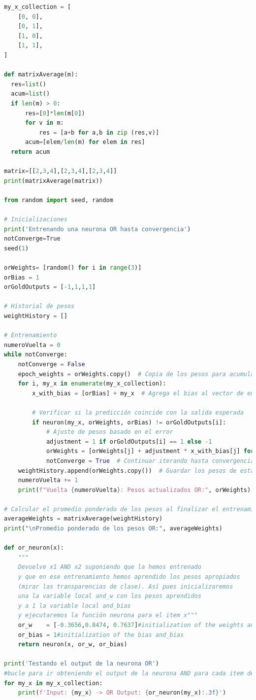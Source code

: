 \documentclass{report}
\begin{document}
        \clearpage
        \begin{lstlisting}[language=Python, caption=Implementación del perceptron para las puerta lógica OR con Weighted average]
my_x_collection = [
    [0, 0],
    [0, 1],
    [1, 0],
    [1, 1],
]

def matrixAverage(m):
  res=list()
  acum=list()
  if len(m) > 0:
      res=[0]*len(m[0])
      for v in m:
          res = [a+b for a,b in zip (res,v)]
      acum=[elem/len(m) for elem in res]
  return acum

matrix=[[2,3,4],[2,3,4],[2,3,4]]
print(matrixAverage(matrix))

from random import seed, random

# Inicializaciones
print('Entrenando una neurona OR hasta convergencia')
notConverge=True
seed(1)

orWeights= [random() for i in range(3)]
orBias = 1
orGoldOutputs = [-1,1,1,1]

# Historial de pesos
weightHistory = []

# Entrenamiento
numeroVuelta = 0
while notConverge:
    notConverge = False
    epoch_weights = orWeights.copy()  # Copia de los pesos para acumular en cada epoch
    for i, my_x in enumerate(my_x_collection):
        x_with_bias = [orBias] + my_x  # Agrega el bias al vector de entrada
        
        # Verificar si la predicción coincide con la salida esperada
        if neuron(my_x, orWeights, orBias) != orGoldOutputs[i]:
            # Ajuste de pesos basado en el error
            adjustment = 1 if orGoldOutputs[i] == 1 else -1
            orWeights = [orWeights[j] + adjustment * x_with_bias[j] for j in range(len(orWeights))]
            notConverge = True  # Continuar iterando hasta convergencia
    weightHistory.append(orWeights.copy())  # Guardar los pesos de esta epoch
    numeroVuelta += 1
    print(f"Vuelta {numeroVuelta}: Pesos actualizados OR:", orWeights)

# Calcular el promedio ponderado de los pesos al finalizar el entrenamiento
averageWeights = matrixAverage(weightHistory)
print("\nPromedio ponderado de los pesos OR:", averageWeights)

def or_neuron(x):
    """
    Devuelve x1 AND x2 suponiendo que la hemos entrenado
    y que en ese entrenamiento hemos aprendido los pesos apropiados 
    (mirar las transparencias de clase). Así pues inicializaremos 
    una la variable local and_w con los pesos aprendidos 
    y a 1 la variable local and_bias 
    y ejecutaremos la función neurona para el item x"""
    or_w    = [-0.3656,0.8474, 0.7637]#initialization of the weights and_w
    or_bias = 1#initialization of the bias and_bias
    return neuron(x, or_w, or_bias)

print('Testando el output de la neurona OR')
#bucle para ir obteniendo el output de la neurona AND para cada item del input
for my_x in my_x_collection:
    print(f'Input: {my_x} -> OR Output: {or_neuron(my_x):.3f}')
        \end{lstlisting}
\end{document}
